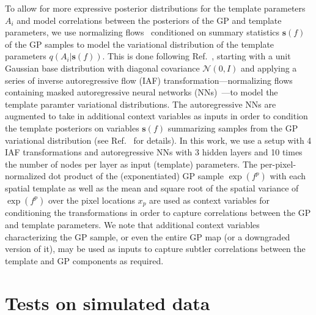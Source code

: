 \documentclass[]{article}
\begin{document}
To allow for more expressive posterior distributions for the template parameters $A_i$ and model correlations between the posteriors of the GP and template parameters, we use normalizing flows~\cite{pmlr-v37-rezende15} conditioned on summary statistics $\mathbf{s}(f)$ of the GP samples to model the variational distribution of the template parameters $q(A_i|\mathbf{s}(f))$.
This is done following Ref.~\cite{quinonero-candela_unifying_2005}, starting with a unit Gaussian base distribution with diagonal covariance $\mathcal{N}(0, I)$ and applying a series of inverse autoregressive flow (IAF) transformation---normalizing flows containing masked autoregressive neural networks (NNs)~\cite{germain2015made}---to model the template paramter variational distributions. The autoregressive NNs are augmented to take in additional context variables as inputs in order to condition the template posteriors on variables $\mathbf{s}(f)$ summarizing samples from the GP variational distribution (see Ref.~\cite{10.5555/3045390.3045710} for details). In this work, we use a setup with 4 IAF transformations and autoregressive NNs with 3 hidden layers and 10 times the number of nodes per layer as input (template) parameters. The per-pixel-normalized dot product of the (exponentiated) GP sample $\exp\left(f^p\right)$ with each spatial template as well as the mean and square root of the spatial variance of $\exp\left(f^p\right)$ over the pixel locations $x_p$ are used as context variables for conditioning the transformations in order to capture correlations between the GP and template parameters. We note that additional context variables characterizing the GP sample, or even the entire GP map (or a downgraded version of it), may be used as inputs to capture subtler correlations between the template and GP components as required.


\section{Tests on simulated data}
\label{sec:experiments}
\end{document}
